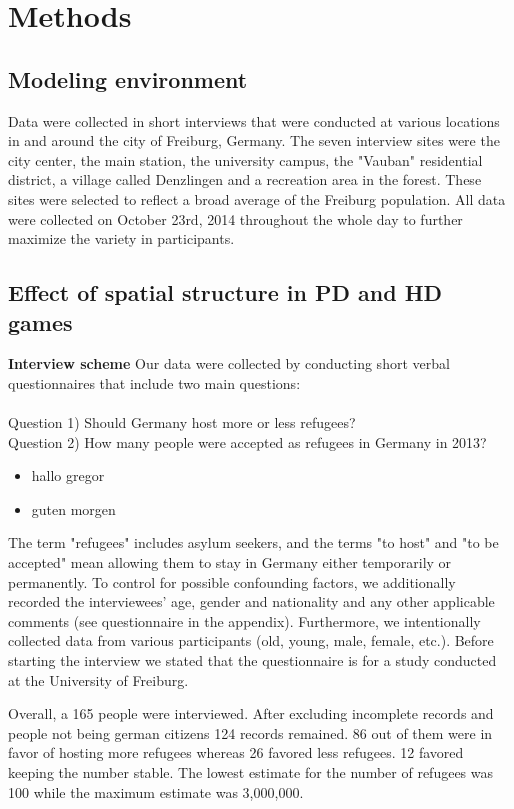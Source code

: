 \section{Methods}

\subsection{Modeling environment}
Data were collected in short interviews that were conducted at various locations in and around the city of Freiburg, Germany. The seven interview sites were the city center, the main station, the university campus, the "Vauban" residential district, a village called Denzlingen and a recreation area in the forest. These sites were selected to reflect a broad average of the Freiburg population. All data were collected on October 23rd, 2014 throughout the whole day to further maximize the variety in participants.

\subsection{Effect of spatial structure in PD and HD games}

\textbf{Interview scheme}
Our data were collected by conducting short verbal questionnaires that include two main questions: \\\\
Question 1) Should Germany host more or less refugees?\\
Question 2) How many people were accepted as refugees in Germany in 2013?\\

\begin{itemize}
	\item hallo gregor
	\item guten morgen
\end{itemize}

The term "refugees" includes asylum seekers, and the terms "to host" and "to be accepted" mean allowing them to stay in Germany either temporarily or permanently. To control for possible confounding factors, we additionally recorded the interviewees’ age, gender and nationality and any other applicable comments (see questionnaire in the appendix). Furthermore, we intentionally collected data from various participants (old, young, male, female, etc.). Before starting the interview we stated that the questionnaire is for a study conducted at the University of Freiburg.

Overall, a 165 people were interviewed. After excluding incomplete records and people not being german citizens 124 records remained. 86 out of them were in favor of hosting more refugees whereas 26 favored less refugees. 12 favored keeping the number stable. The lowest estimate for the number of refugees was 100 while the maximum estimate was 3,000,000.





